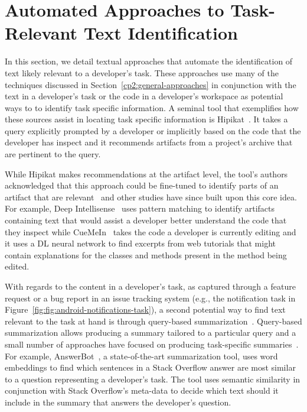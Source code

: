 



\section{Automated Approaches to Task-Relevant Text Identification}
\label{cp2:task-approaches}



In this section, we detail textual approaches that automate the identification 
of text likely relevant to a developer's task. These approaches 
use many of the techniques discussed in Section~\ref{cp2:general-approaches}
in conjunction with the text in a developer's task
 or the code in a developer's workspace
as potential ways to 
to identify task specific information.
A seminal tool that exemplifies 
how these sources assist in locating task specific information is
Hipikat~\cite{Cubranic2005}.
It takes a query explicitly prompted by a developer 
or implicitly based on the code that the developer 
has inspect and  
it recommends artifacts from a project's archive 
that are pertinent to the query.


While Hipikat makes recommendations at the artifact level, 
the tool's authors acknowledged that 
this approach could be fine-tuned to identify 
parts of an artifact that are relevant~\cite{Cubranic2005}
and other studies have since built upon this core idea. 
For example, Deep Intellisense~\cite{Holmes2008} 
uses pattern matching to 
identify 
artifacts containing text that 
would assist a developer
better understand the code that they inspect
while 
CueMeIn~\cite{sun2021} takes the code 
a developer is currently editing and it
uses a \acs{DL} neural network to find 
excerpts from web tutorials 
that might contain explanations 
for the classes and methods 
present in the method being edited. 





With regards to the content in a developer's task, as captured through a feature 
request or a bug report in an issue tracking system (e.g., the notification task in Figure~\ref{fig:fig:android-notifications-task}),
a second potential way to find text relevant to the task at hand is through query-based summarization~\cite{Goldsteinet1999}.
Query-based summarization allows 
producing a summary tailored to a particular query
and a small number of approaches have focused on
producing task-specific summaries~\cite{Xu2017, silva2019, liu2019qapi}.
For example, AnswerBot~\cite{Xu2017}, a state-of-the-art summarization tool, 
uses word embeddings to find which sentences in a Stack Overflow answer 
are most similar to a question  representing a developer's task.
The tool uses semantic similarity in conjunction with 
Stack Overflow's meta-data to decide which text should it include
in the summary that answers the developer's question. 







